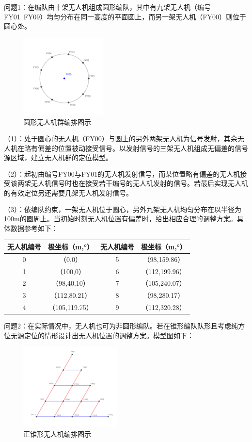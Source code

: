 问题1：在编队由十架无人机组成圆形编队，其中有九架无人机（编号FY01~FY09）均匀分布在同一高度的平面圆上，而另一架无人机（FY00）则位于圆心处。

\begin{figure}[h]
    \centering
    \includegraphics[scale=0.7]{../res/circleFormation.png}
    \caption{圆形无人机群编排图示}
\end{figure}

（1）：处于圆心的无人机（FY00）与圆上的另外两架无人机为信号发射，其余无人机在略有偏差的位置被动接受信号。以发射信号的三架无人机组成无偏差的信号源区域，建立无人机群的定位模型。

（2）：起初由编号FY00与FY01的无人机发射信号，而某位置略有偏差的无人机接受该两架无人机信号时也在接受若干编号的无人机发射的信号。若最后实现无人机的有效定位另还需要几架无人机发射信号。

（3）：依编队约束，一架无人机位于圆心，另外九架无人机均匀分布在以半径为100m的圆周上。当初始时刻无人机位置有偏差时，给出相应合理的调整方案。具体数据参考如下：

\begin{tabular}{cc|cc}
    \toprule
    无人机编号& 极坐标（m,°）&  无人机编号& 极坐标（m,°）\\
    \midrule
    0&（0,0）&5	&（98,159.86）\\

    1	&（100,0）&	6&	（112,199.96）\\
    
    2	&（98,40.10）&	7	&（105,240.07）\\
    
    3	&（112,80.21）&	8	&（98,280.17）\\
    
    4	&（105,119.75）&	9&	（112,320.28）\\
    \bottomrule
\end{tabular}

问题2：在实际情况中，无人机也可为非圆形编队。若在锥形编队队形且考虑纯方位无源定位的情形设计出无人机位置的调整方案。模型图如下：

\begin{figure}
    \centering
    \includegraphics[scale=0.7]{../res/regularTriangleFormation.png}
    \caption{正锥形无人机编排图示}
\end{figure}


